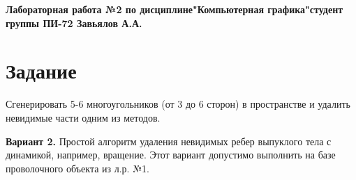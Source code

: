 \documentclass[a4paper,12pt]{article}
\begin{document}

\begin{center}
  \textbf{Лабораторная работа №2 по дисциплине\linebreak"Компьютерная графика"\linebreak{} студент группы ПИ-72 Завьялов А.А.}\\
\end{center}

\section{\normalsize{Задание}}
\begin{flushleft}
  Сгенерировать 5-6 многоугольников (от 3 до 6 сторон) в пространстве и удалить невидимые части одним из методов.
\end{flushleft}

\begin{flushleft}
  \textbf{Вариант 2.} Простой алгоритм удаления невидимых ребер выпуклого тела с динамикой, например, вращение. Этот вариант допустимо выполнить на базе проволочного объекта из л.р. №1.
\end{flushleft}
\end{document}
